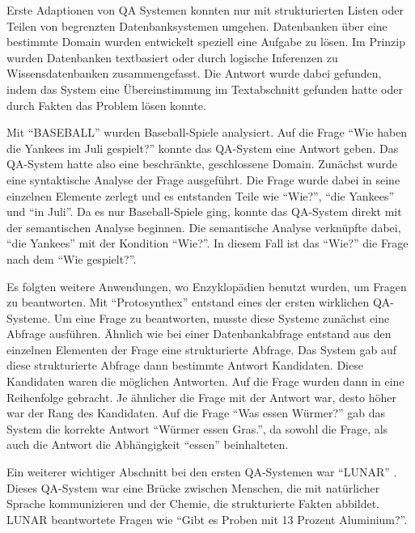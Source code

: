 \documentclass[../Masterarbeit.tex]{subfiles}
\begin{document}
Erste Adaptionen von QA Systemen konnten nur mit strukturierten Listen oder Teilen von begrenzten Datenbanksystemen umgehen. Datenbanken über eine bestimmte Domain wurden entwickelt speziell eine Aufgabe zu lösen. Im Prinzip wurden Datenbanken textbasiert oder durch logische Inferenzen zu Wissensdatenbanken zusammengefasst. Die Antwort wurde dabei gefunden, indem das System eine Übereinstimmung im Textabschnitt gefunden hatte oder durch Fakten das Problem lösen konnte.

Mit \enquote{BASEBALL}  \citep{Green1961Baseball:Question-answerer} wurden Baseball-Spiele analysiert.  Auf die Frage \enquote{Wie haben die Yankees im Juli gespielt?} konnte das QA-System eine Antwort geben. Das QA-System hatte also eine beschränkte, geschlossene Domain. Zunächst wurde eine syntaktische Analyse der Frage ausgeführt. Die Frage wurde dabei in seine einzelnen Elemente zerlegt und es entstanden Teile wie \enquote{Wie?}, \enquote{die Yankees} und \enquote{in Juli}. Da es nur Baseball-Spiele ging, konnte das QA-System direkt mit der semantischen Analyse beginnen. Die semantische Analyse verknüpfte dabei, \enquote{die Yankees} mit der Kondition \enquote{Wie?}. In diesem Fall ist das \enquote{Wie?} die Frage nach dem \enquote{Wie gespielt?}.

Es folgten weitere Anwendungen, wo Enzyklopädien benutzt wurden, um Fragen zu beantworten. Mit \enquote{Protosynthex}\citep{Simmons1964IndexingQuestions} entstand eines der ersten wirklichen QA-Systeme. Um eine Frage zu beantworten, musste diese Systeme zunächst eine Abfrage ausführen. Ähnlich wie bei einer Datenbankabfrage entstand aus den einzelnen Elementen der Frage eine strukturierte Abfrage. Das System gab auf diese strukturierte Abfrage dann bestimmte Antwort Kandidaten. Diese Kandidaten waren die möglichen Antworten. Auf die Frage wurden dann in eine Reihenfolge gebracht. Je ähnlicher die Frage mit der Antwort war, desto höher war der Rang des Kandidaten. Auf die Frage \enquote{Was essen Würmer?} gab das System die korrekte Antwort \enquote{Würmer essen Gras.}, da sowohl die Frage, als auch die Antwort die Abhängigkeit \enquote{essen} beinhalteten. 

Ein weiterer wichtiger Abschnitt bei den ersten QA-Systemen war \enquote{LUNAR} \citep{Woods1978SemanticsAnswering}. Dieses QA-System war eine Brücke zwischen Menschen, die mit natürlicher Sprache kommunizieren und der Chemie, die strukturierte Fakten abbildet. LUNAR beantwortete  Fragen wie \enquote{Gibt es Proben mit 13 Prozent Aluminium?}.
\end{document}
